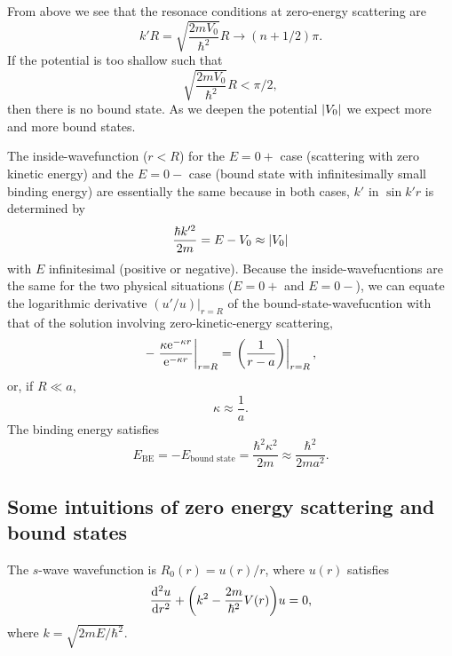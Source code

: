 \documentclass[10pt]{article}
\begin{document}
	From above we see that the resonace conditions at zero-energy scattering are
	\begin{equation}
		k' R = \sqrt{\frac{2mV_0}{\hbar^2}} R \to (n+1/2) \pi.
	\end{equation}
	If the potential is too shallow such that
	\begin{equation}
		\sqrt{\frac{2mV_0}{\hbar^2}} R < \pi/2,
	\end{equation}
	then there is no bound state. As we deepen the potential $\abs{V_0}$ we expect more and more bound states.

	The inside-wavefunction ($r<R$) for the $E = 0 +$ case (scattering with zero kinetic energy) and the $E = 0-$ case (bound state with infinitesimally small binding energy) are essentially the same because in both cases, $k'$ in $\sin{k'r}$ is determined by
	\begin{equation}
		\frac{\hbar k'^2}{2m} = E-V_0 \approx \abs{V_0}
	\end{equation}
	with $E$ infinitesimal (positive or negative).
	Because the inside-wavefucntions are the same for the two physical situations ($E = 0+$ and $E= 0-$), we can equate the logarithmic derivative $(u'/u)|_{r=R}$ of the bound-state-wavefucntion with that of the solution involving zero-kinetic-energy scattering,
	\begin{equation}
		-\eval{\frac{\kappa \e^{-\kappa r}}{\e^{-\kappa r}}}_{r=R} = \eval{\qty(\frac{1}{r-a})}_{r=R},
	\end{equation}
	or, if $R \ll a$,
	\begin{equation}
		\kappa \approx \frac{1}{a}.
	\end{equation}
	The binding energy satisfies
	\begin{equation}
		E_{\text{BE}} = -E_{\text{bound state}} = \frac{\hbar^2 \kappa^2}{2m} \approx \frac{\hbar^2}{2ma^2}.
	\end{equation}



\subsection{Some intuitions of zero energy scattering and bound states }
The $s$-wave wavefunction is $R_0(r) = u(r)/r$, where $u(r)$ satisfies
\begin{equation}
	\dv[2]{u}{r} + \qty(k^2 - \frac{2m}{\hbar^2}V(r)) u = 0,
\end{equation}
where $k = \sqrt{2mE/\hbar^2}$.
\end{document}
